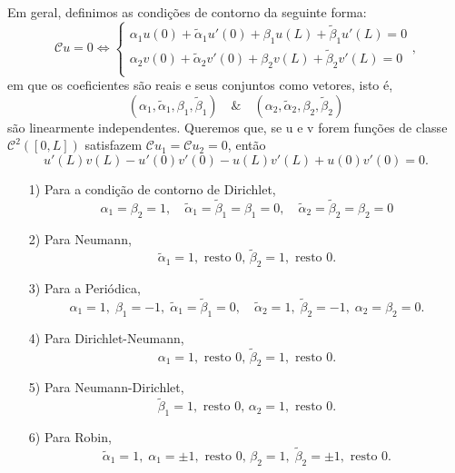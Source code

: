 \documentclass[../pde_notes.tex]{subfiles}
\begin{document}
Em geral, definimos as condições de contorno da seguinte forma:
\[
	\mathcal{C}u = 0 \Longleftrightarrow \left\{\begin{array}{ll}
		\alpha_1 u(0) + \tilde{\alpha }_1u'(0) + \beta_1u(L) + \tilde{\beta }_1u'(L) = 0 \\
		\alpha_2 v(0) + \tilde{\alpha }_2v'(0) + \beta_2v(L) + \tilde{\beta }_2v'(L) = 0 \\
	\end{array}\right.,
\]
em que os coeficientes são reais e seus conjuntos como vetores, isto é,
\[
	(\alpha_1, \tilde{\alpha }_1, \beta_1, \tilde{\beta }_1) \quad\&\quad (\alpha_2, \tilde{\alpha }_2, \beta_2, \tilde{\beta }_2)
\]
são linearmente independentes. Queremos que, se u e v forem funções de classe \(\mathcal{C}^{2}([0, L])\) satisfazem \(\mathcal{C}u_1 = \mathcal{C}u_2 = 0\), então
\[
	u'(L)v(L) - u'(0)v'(0) - u(L)v'(L) + u(0)v'(0) = 0.
\]
\begin{example}
	\begin{itemize}
		\item[1)]Para a condição de contorno de Dirichlet,
		      \[
			      \alpha_1 = \beta_2 = 1,\quad  \tilde{\alpha}_1 = \tilde{\beta }_1 = \beta_1 = 0, \quad \tilde{\alpha}_2 = \tilde{\beta }_2 = \beta_2 = 0
		      \]
		\item[2)] Para Neumann,
		      \[
			      \tilde{\alpha}_{1} = 1, \text{ resto 0, } \tilde{\beta}_2 = 1, \text{ resto 0}.
		      \]
		\item[3)] Para a Periódica,
		      \[
			      \alpha_1 = 1,\; \beta_1 = -1,\; \tilde{\alpha }_1 = \tilde{\beta }_1 = 0,\quad \tilde{\alpha }_2 = 1,\; \tilde{\beta }_2 = -1,\; \alpha_2 = \beta_2 = 0.
		      \]
		\item[4)] Para Dirichlet-Neumann,
		      \[
			      \alpha_{1} = 1, \text{ resto 0, } \tilde{\beta}_2 = 1, \text{ resto 0}.
		      \]
		\item[5)] Para Neumann-Dirichlet,
		      \[
			      \tilde{\beta}_{1} = 1, \text{ resto 0, } \alpha_2 = 1, \text{ resto 0}.
		      \]
		\item[6)] Para Robin,
		      \[
			      \tilde{\alpha}_{1} = 1,\; \alpha_1 = \pm 1, \text{ resto 0, } \beta_2 = 1,\; \tilde{\beta}_2 = \pm1, \text{ resto 0}.
		      \]
	\end{itemize}
\end{example}
\end{document}

